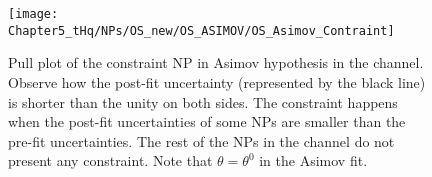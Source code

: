 \begin{figure}[h]
\centering
\texttt{[image: Chapter5\_tHq/NPs/OS\_new/OS\_ASIMOV/OS\_Asimov\_Contraint]}
\caption{Pull plot of the constraint NP in Asimov hypothesis in the \dilepOStau channel.
Observe how the post-fit uncertainty (represented by the black line) is shorter than the unity on both sides.
The constraint happens when the post-fit uncertainties of some NPs are smaller than the pre-fit uncertainties.
The rest of the NPs in the \dilepOStau channel do not present any constraint.
Note that $\theta = \theta^{0}$ in the Asimov fit.} 
\label{fig:ChaptH:Asimov:OS:ConstrainedNP}
\end{figure}


